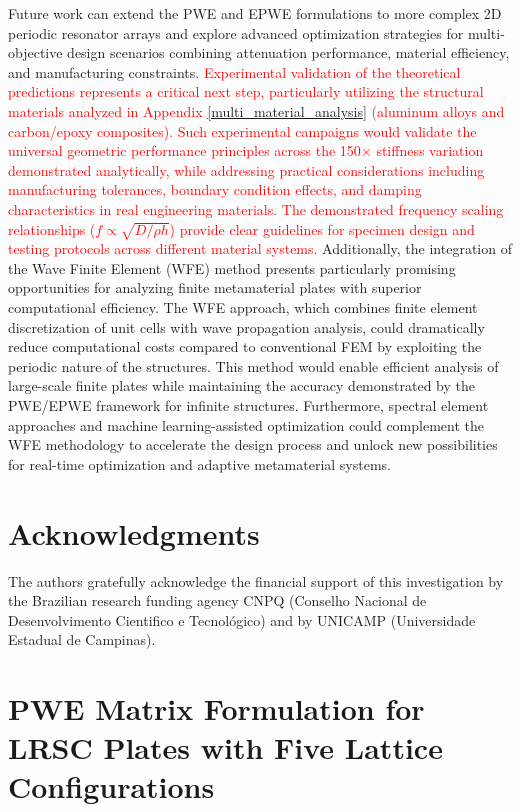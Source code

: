 \documentclass[review,numbers,sort&compress]{elsarticle}
\begin{document}
Future work can extend the PWE and EPWE formulations to more complex 2D periodic resonator arrays and explore advanced optimization strategies for multi-objective design scenarios combining attenuation performance, material efficiency, and manufacturing constraints. \textcolor{red}{Experimental validation of the theoretical predictions represents a critical next step, particularly utilizing the structural materials analyzed in Appendix \ref{multi_material_analysis} (aluminum alloys and carbon/epoxy composites). Such experimental campaigns would validate the universal geometric performance principles across the 150× stiffness variation demonstrated analytically, while addressing practical considerations including manufacturing tolerances, boundary condition effects, and damping characteristics in real engineering materials. The demonstrated frequency scaling relationships ($f \propto \sqrt{D/\rho h}$) provide clear guidelines for specimen design and testing protocols across different material systems.} Additionally, the integration of the Wave Finite Element (WFE) method presents particularly promising opportunities for analyzing finite metamaterial plates with superior computational efficiency. The WFE approach, which combines finite element discretization of unit cells with wave propagation analysis, could dramatically reduce computational costs compared to conventional FEM by exploiting the periodic nature of the structures. This method would enable efficient analysis of large-scale finite plates while maintaining the accuracy demonstrated by the PWE/EPWE framework for infinite structures. Furthermore, spectral element approaches and machine learning-assisted optimization could complement the WFE methodology to accelerate the design process and unlock new possibilities for real-time optimization and adaptive metamaterial systems.


\newpage
\section*{Acknowledgments}
The authors gratefully acknowledge the financial support of this investigation by the Brazilian research funding agency CNPQ (Conselho Nacional de Desenvolvimento Cientifico e Tecnológico) and by UNICAMP (Universidade Estadual de Campinas).

\newpage
\appendix
\section{PWE Matrix Formulation for LRSC Plates with Five Lattice Configurations}\label{AppenA_supplement_results1}
\end{document}
